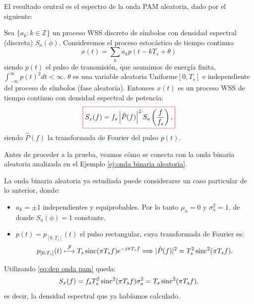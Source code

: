 El resultado central es el espectro de la onda PAM aleatoria, dado por el siguiente:
\begin{teorema}\label{teorema:dep onda pam}
    Sea $\{a_k:k\in\mathbb{Z}\}$ un proceso WSS discreto de símbolos con densidad espectral (discreta) $S_a(\phi)$. Consideremos el proceso estocástico de tiempo continuo:
    \begin{equation}\label{eq:onda pam aleatoria}
        x(t) = \sum_k a_k p(t-kT_s + \theta)
    \end{equation}
    siendo $p(t)$ el pulso de transmisión, que asumimos de energía finita, $\int_{-\infty}^\infty p(t)^2 dt <\infty$. $\theta$ es una variable aleatoria $\mathrm{Uniforme}[0,T_s]$ e independiente del proceso de símbolos (fase aleatoria). Entonces $x(t)$ es un proceso WSS de tiempo continuo con densidad espectral de potencia:
    \begin{equation}\label{eq:dep onda pam}
    {\color{Red}\boxed{\normalcolor S_x(f) = f_s \left|\hat{P}(f)\right|^2 S_a\left(\frac{f}{f_s}\right),}}
    \end{equation}
    siendo $\hat{P}(f)$ la transformada de Fourier del pulso $p(t)$.
\end{teorema}

Antes de proceder a la prueba, veamos cómo se conecta con la onda binaria aleatoria analizada en el Ejemplo \ref{ej:onda binaria aleatoria}.
\begin{ejemplo}

    La onda binaria aleatoria ya estudiada puede considerarse un caso particular de lo anterior, donde:
    \begin{itemize}
        \item $a_k=\pm 1$ independientes y equiprobables. Por lo tanto $\mu_a=0$ y $\sigma_a^2=1$, de donde $S_a(\phi) = 1$ constante.
        \item $p(t) = p_{[0,T_s]}(t)$ el pulso rectangular, cuya transformada de Fourier es:
         \begin{equation*}
            p_{[0,T_s]}(t) \;\displaystyle{\mathop{\longmapsto}^{\mathcal{F}}}\; T_s \operatorname{sinc}(\pi T_s f) \mathrm{e}^{-j\pi T_s f} \Longrightarrow |\hat{P}(f)|^2 = T_s^2 \operatorname{sinc}^2(\pi T_s f).
         \end{equation*}
    \end{itemize}
    Utilizando \eqref{eq:dep onda pam} queda:
    \begin{equation*}
        S_x(f) = f_s T_s^2 \operatorname{sinc}^2(\pi T_s f) \sigma_a^2 = T_s \operatorname{sinc}^2(\pi T_s f),
    \end{equation*}
    es decir, la densidad espectral que ya habíamos calculado.
\end{ejemplo}

